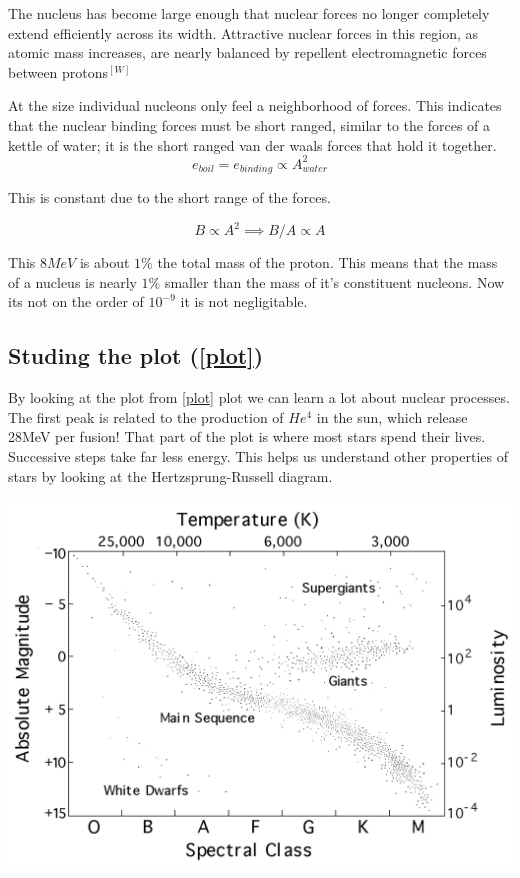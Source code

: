 \documentclass[english, 11pt]{article}
\begin{document}
\begin{defn}\label{sat}
The nucleus has become large enough that nuclear forces no longer completely extend efficiently across its width. Attractive nuclear forces in this region, as atomic mass increases, are nearly balanced by repellent electromagnetic forces between protons$^{[W]}$
\end{defn}

At the size individual nucleons only feel a neighborhood of forces. This indicates that the nuclear binding forces must be short ranged, similar to the forces of a kettle of water; it is the short ranged van der waals forces that hold it together.
\\
\[ e_{boil} = e_{binding} \propto A^2_{water} \]

This is constant due to the short range of the forces.

\[ B \propto A^2 \implies B/A  \propto A\]

This $8 MeV$ is about $1\%$ the total mass of the proton. This means that the mass of a nucleus is nearly $1\%$ smaller than the mass of it's constituent nucleons. Now its not on the order of $10^{-9}$ it is not negligitable.

\subsection{Studing the plot (\ref{plot})}

By looking at the plot from \ref{plot} plot we can learn a lot about nuclear processes.
The first peak is related to the production of $He^{4}$ in the sun, which release 28MeV per fusion! That part of the plot is where most stars spend their lives. Successive steps take far less energy. This helps us understand other properties of stars by looking at the Hertzsprung-Russell diagram.

\begin{center}\label{rus}
 \includegraphics[scale=0.23]{../img/rus}
\end{center}
\end{document}
